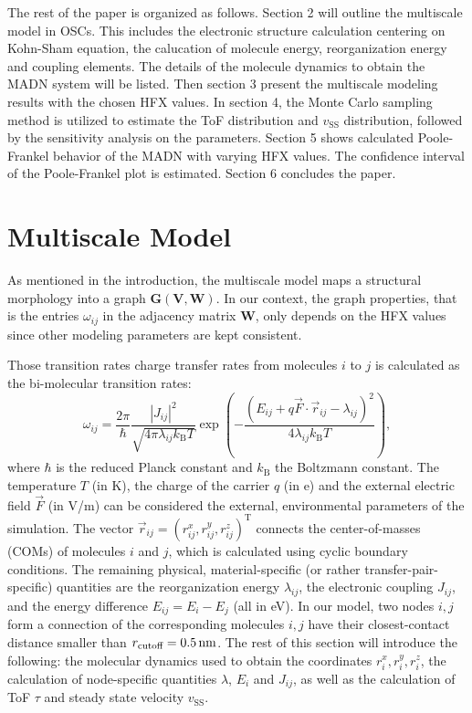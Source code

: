 \documentclass[%
 reprint,
 amsmath,amssymb,
 aps,
]{revtex4-2}
\begin{document}
The rest of the paper is organized as follows. Section 2 will outline the multiscale model in OSCs. This includes the electronic structure calculation centering on Kohn-Sham equation, the calucation of molecule energy, reorganization energy and coupling elements. The details of the molecule dynamics to obtain the MADN system will be listed.
Then section 3 present the multiscale modeling results with the chosen HFX values. In section 4, the Monte Carlo sampling method is utilized to estimate the ToF distribution and $v_\text{SS}$ distribution, followed by the sensitivity analysis on the parameters. 
Section 5 shows calculated Poole-Frankel behavior of the MADN with varying HFX values. The confidence interval of the Poole-Frankel plot is estimated. Section 6 concludes the paper. 
\section{Multiscale Model}
As mentioned in the introduction, the multiscale model maps a structural morphology into a graph $\mathbf{G}(\mathbf{V}, \mathbf{W})$. In our context, the graph properties, that is the entries $\omega_{ij}$ in the adjacency matrix $\mathbf{W}$, only depends on the HFX values since other modeling parameters are kept consistent. 

Those transition rates charge transfer rates from molecules $i$ to $j$ is calculated as the bi-molecular transition rates:
%
\begin{equation}
    \omega_{ij} = \frac{2\pi}{\hbar} \frac{|J_{ij}|^2}{\sqrt{4\pi \lambda_{ij} k_\text{B}T}} \exp\left(-\frac{(E_{ij} + q \vec{F} \cdot \vec{r}_{ij} - \lambda_{ij})^2}{4\lambda_{ij} k_\text{B}T}\right) ,
    \label{equ:Marcus}
\end{equation}
%
where $\hbar$ is the reduced Planck constant and $k_\text{B}$ the Boltzmann constant. The temperature $T$ (in \unit[]{K}), the charge of the carrier $q$ (in \unit[]{e}) and the external electric field $\vec{F}$ (in V/m) can be considered the external, environmental parameters of the simulation. The vector $\vec{r}_{ij} = (r^x_{ij},r^y_{ij},r^z_{ij})^\text{T}$ connects the center-of-masses (COMs) of molecules $i$ and $j$, which is calculated using cyclic boundary conditions. 
The remaining physical, material-specific (or rather transfer-pair-specific) quantities are the reorganization energy $\lambda_{ij}$, the electronic coupling $J_{ij}$, and the energy difference $E_{ij} = E_i - E_j$ (all in \unit[]{eV}). 
In our model, two nodes $i,j$ form a connection of the corresponding molecules $i,j$ have their closest-contact distance smaller than $r_\text{cutoff}=\unit[0.5]{nm}$.
The rest of this section will introduce the following: the molecular dynamics used to obtain the coordinates $r^x_{i},r^y_{i},r^z_{i}$, the calculation of node-specific quantities $\lambda$, $E_i$ and $J_{ij}$, as well as the calculation of ToF $\tau$ and steady state velocity $v_\text{SS}$.
\end{document}
